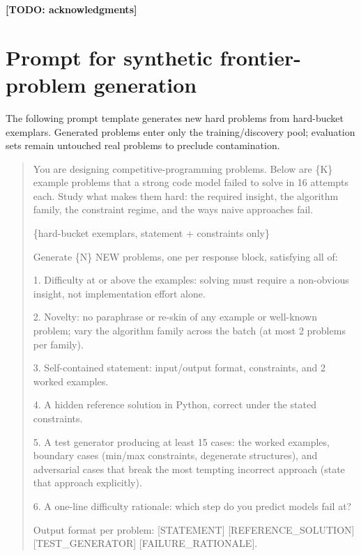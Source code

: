 \documentclass{article}
\newcommand{\todo}[1]{\textcolor{orange!75!black}{\textbf{[TODO: #1]}}}
\begin{document}
\begin{ack}
\todo{acknowledgments}
\end{ack}




\appendix

\section{Prompt for synthetic frontier-problem generation}
\label{app:prompt}

The following prompt template generates new hard problems from hard-bucket exemplars. Generated problems enter only the training/discovery pool; evaluation sets remain untouched real problems to preclude contamination.

\begin{quote}\small\ttfamily
You are designing competitive-programming problems. Below are \{K\} example problems that a strong code model failed to solve in 16 attempts each. Study what makes them hard: the required insight, the algorithm family, the constraint regime, and the ways naive approaches fail.

\{hard-bucket exemplars, statement + constraints only\}

Generate \{N\} NEW problems, one per response block, satisfying all of:

1. Difficulty at or above the examples: solving must require a non-obvious insight, not implementation effort alone.

2. Novelty: no paraphrase or re-skin of any example or well-known problem; vary the algorithm family across the batch (at most 2 problems per family).

3. Self-contained statement: input/output format, constraints, and 2 worked examples.

4. A hidden reference solution in Python, correct under the stated constraints.

5. A test generator producing at least 15 cases: the worked examples, boundary cases (min/max constraints, degenerate structures), and adversarial cases that break the most tempting incorrect approach (state that approach explicitly).

6. A one-line difficulty rationale: which step do you predict models fail at?

Output format per problem: [STATEMENT] [REFERENCE\_SOLUTION] [TEST\_GENERATOR] [FAILURE\_RATIONALE].
\end{quote}
\end{document}
